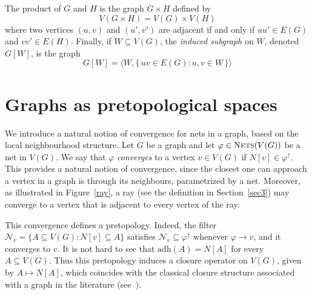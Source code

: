 \documentclass{amsart}
\theoremstyle{definition}
\theoremstyle{remark}
\numberwithin{equation}{section}
\begin{document}
The  product of $G$ and $H$ is the graph $G\times H$ defined by
\[
V(G\times H)=V(G)\times V(H)
\]
where two vertices $(u,v)$ and $(u',v')$ are adjacent if and only if $uu'\in E(G)$ and $vv'\in E(H)$.
Finally, if $W\subseteq V(G)$, the \emph{induced subgraph} on $W$, denoted $G[W]$, is the graph
\[
G[W]=\langle W,\{\,uv\in E(G): u,v\in W\,\}\rangle
\]
\section{Graphs as pretopological spaces}

\label{sec2}


We introduce a natural notion of convergence for nets in a graph, based on the
local neighbourhood structure. Let $G$ be a graph and let 
$\varphi\in\textsc{Nets}(V(G))$ be a net in $V(G)$. We say that $\varphi$
\emph{converges} to a vertex $v\in V(G)$ if $N[v]\in\varphi^{\uparrow}$.
This provides a natural notion of convergence, since the closest one can
approach a vertex in a graph is through its neighbours, parametrized by a net.
Moreover, as illustrated in Figure~\ref{ray}, a ray (see the definition in Section~\ref{sec3}) may converge to a vertex
that is adjacent to every vertex of the ray.

This convergence defines a pretopology. Indeed, the filter
$\mathcal{N}_v=\{A\subseteq V(G): N[v]\subseteq A\}$ satisfies
$\mathcal{N}_v\subseteq\varphi^{\uparrow}$ whenever $\varphi\to v$, and it
converges to $v$. It is not hard to see that $\mathrm{adh}(A)=N[A]$ for every
$A\subseteq V(G)$. Thus this pretopology induces a closure operator on $V(G)$,
given by $A\mapsto N[A]$, which coincides with the classical closure structure
associated with a graph in the literature (see~\cite{milićević2024directedvietorisripscomplexhomotopy}).
	
\end{document}
